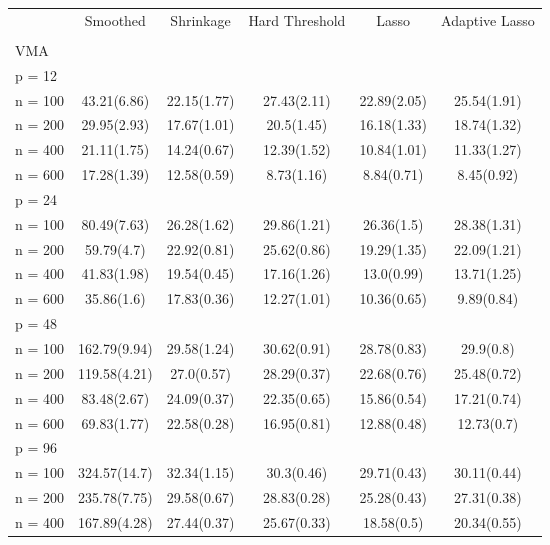 \begin{table}
\begin{tabular}{l@{\hskip 0.4in}ccccc}
\\
& Smoothed   & Shrinkage & Hard Threshold  & Lasso & Adaptive Lasso\\
\\
VMA & & & & &\\
p = 12 & & & & &\\
\multicolumn{1}{r}{n = 100}&43.21(6.86)&22.15(1.77)&27.43(2.11)&22.89(2.05)&25.54(1.91)\\
\multicolumn{1}{r}{n = 200}&29.95(2.93)&17.67(1.01)&20.5(1.45)&16.18(1.33)&18.74(1.32)\\
\multicolumn{1}{r}{n = 400}&21.11(1.75)&14.24(0.67)&12.39(1.52)&10.84(1.01)&11.33(1.27)\\
\multicolumn{1}{r}{n = 600}&17.28(1.39)&12.58(0.59)&8.73(1.16)&8.84(0.71)&8.45(0.92)\\
p = 24 & & & & &\\
\multicolumn{1}{r}{n = 100}&80.49(7.63)&26.28(1.62)&29.86(1.21)&26.36(1.5)&28.38(1.31)\\
\multicolumn{1}{r}{n = 200}&59.79(4.7)&22.92(0.81)&25.62(0.86)&19.29(1.35)&22.09(1.21)\\
\multicolumn{1}{r}{n = 400}&41.83(1.98)&19.54(0.45)&17.16(1.26)&13.0(0.99)&13.71(1.25)\\
\multicolumn{1}{r}{n = 600}&35.86(1.6)&17.83(0.36)&12.27(1.01)&10.36(0.65)&9.89(0.84)\\
p = 48 & & & & &\\
\multicolumn{1}{r}{n = 100}&162.79(9.94)&29.58(1.24)&30.62(0.91)&28.78(0.83)&29.9(0.8)\\
\multicolumn{1}{r}{n = 200}&119.58(4.21)&27.0(0.57)&28.29(0.37)&22.68(0.76)&25.48(0.72)\\
\multicolumn{1}{r}{n = 400}&83.48(2.67)&24.09(0.37)&22.35(0.65)&15.86(0.54)&17.21(0.74)\\
\multicolumn{1}{r}{n = 600}&69.83(1.77)&22.58(0.28)&16.95(0.81)&12.88(0.48)&12.73(0.7)\\
p = 96 & & & & &\\
\multicolumn{1}{r}{n = 100}&324.57(14.7)&32.34(1.15)&30.3(0.46)&29.71(0.43)&30.11(0.44)\\
\multicolumn{1}{r}{n = 200}&235.78(7.75)&29.58(0.67)&28.83(0.28)&25.28(0.43)&27.31(0.38)\\
\multicolumn{1}{r}{n = 400}&167.89(4.28)&27.44(0.37)&25.67(0.33)&18.58(0.5)&20.34(0.55)\\

\end{tabular}
\end{table}
